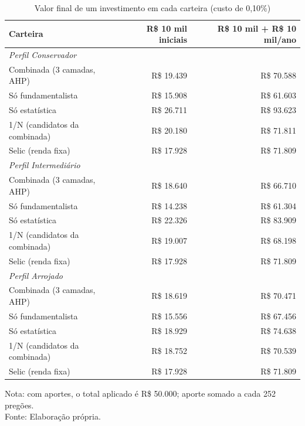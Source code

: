 \begin{table}[htbp]
\centering
\caption{Valor final de um investimento em cada carteira (custo de 0,10\%)}
\label{tab:patrimonio}
\footnotesize
\begin{tabular}{lrr}
\toprule
\textbf{Carteira} & \textbf{R\$ 10 mil iniciais} & \textbf{R\$ 10 mil + R\$ 10 mil/ano} \\
\midrule
\multicolumn{3}{l}{\textit{Perfil Conservador}} \\
Combinada (3 camadas, AHP) & R\$ 19.439 & R\$ 70.588 \\
Só fundamentalista & R\$ 15.908 & R\$ 61.603 \\
Só estatística & R\$ 26.711 & R\$ 93.623 \\
1/N (candidatos da combinada) & R\$ 20.180 & R\$ 71.811 \\
Selic (renda fixa) & R\$ 17.928 & R\$ 71.809 \\
\midrule
\multicolumn{3}{l}{\textit{Perfil Intermediário}} \\
Combinada (3 camadas, AHP) & R\$ 18.640 & R\$ 66.710 \\
Só fundamentalista & R\$ 14.238 & R\$ 61.304 \\
Só estatística & R\$ 22.326 & R\$ 83.909 \\
1/N (candidatos da combinada) & R\$ 19.007 & R\$ 68.198 \\
Selic (renda fixa) & R\$ 17.928 & R\$ 71.809 \\
\midrule
\multicolumn{3}{l}{\textit{Perfil Arrojado}} \\
Combinada (3 camadas, AHP) & R\$ 18.619 & R\$ 70.471 \\
Só fundamentalista & R\$ 15.556 & R\$ 67.456 \\
Só estatística & R\$ 18.929 & R\$ 74.638 \\
1/N (candidatos da combinada) & R\$ 18.752 & R\$ 70.539 \\
Selic (renda fixa) & R\$ 17.928 & R\$ 71.809 \\
\bottomrule
\end{tabular}

\vspace{0.2cm}
\small Nota: com aportes, o total aplicado é R\$ 50.000; aporte somado a cada 252 pregões.\\
Fonte: Elaboração própria.
\end{table}
